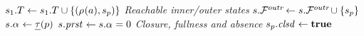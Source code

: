 \documentclass{article}
\begin{document}
\begin{algorithm}
{\begin{minipage}[t]{.55\textwidth}
\begin{algorithmic}[1]
		\State $s_1.T_{\smash{\mkern2mu}} \gets s_1.T_{\smash{\mkern2mu}} \cup \{{(\rho_{\!\,}(a),s_p)}\}$
	\EndFor
	\State \emph{Reachable inner/outer states}
		\State $s.\mathcal{F}^{\smash{outr\!}}_{\smash{\!\mkern2mu}} \gets s.\mathcal{F}^{\smash{outr\!}}_{\smash{\!\mkern2mu}} \cup \{{s_p}\}$
	\EndFor
\EndIf
{}
			\State $s.\ALevel \gets \pTLevel(p)$
			\State $s.\mathit{prst}_{\!\,} \gets s.\alpha_{} = 0$
		\EndIf
	\EndFor
\EndIf
\State \emph{Closure, fullness and absence}
	\State $s_p.\mathit{clsd}_{} \gets \mathbf{true}$
			\EndIf
		\EndFor
	\EndIf
\EndIf
\end{algorithmic}\end{minipage}}
\end{algorithm}
\end{document}
